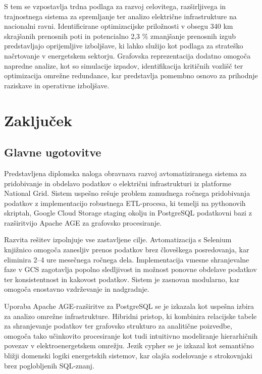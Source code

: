 \documentclass[a4paper,12pt,openright]{book}
\begin{document}
S tem se vzpostavlja trdna podlaga za razvoj celovitega, razširljivega in trajnostnega sistema za spremljanje ter analizo električne infrastrukture na nacionalni ravni. Identificirane optimizacijske priložnosti v obsegu 340 km skrajšanih prenosnih poti in potencialno 2,3 \% zmanjšanje prenosnih izgub predstavljajo oprijemljive izboljšave, ki lahko služijo kot podlaga za strateško načrtovanje v energetskem sektorju. Grafovska reprezentacija dodatno omogoča napredne analize, kot so simulacije izpadov, identifikacija kritičnih vozlišč ter optimizacija omrežne redundance, kar predstavlja pomembno osnovo za prihodnje raziskave in operativne izboljšave.








\chapter{Zaključek}
\section{Glavne ugotovitve}
Predstavljena diplomska naloga obravnava razvoj avtomatiziranega sistema za pridobivanje in obdelavo podatkov o električni infrastrukturi iz platforme National Grid. Sistem uspešno rešuje problem zamudnega ročnega pridobivanja podatkov z implementacijo robustnega ETL-procesa, ki temelji na pythonovih skriptah, Google Cloud Storage staging okolju in PostgreSQL podatkovni bazi z razširitvijo Apache AGE za grafovsko procesiranje.

Razvita rešitev izpolnjuje vse zastavljene cilje. Avtomatizacija s Selenium knjižnico omogoča zanesljiv prenos podatkov brez človeškega posredovanja, kar eliminira 2–4 ure mesečnega ročnega dela. Implementacija vmesne shranjevalne faze v GCS zagotavlja popolno sledljivost in možnost ponovne obdelave podatkov ter konsistentnost in kakovost podatkov. Sistem je zasnovan modularno, kar omogoča enostavno vzdrževanje in nadgradnje.

Uporaba Apache AGE-razširitve za PostgreSQL se je izkazala kot uspešna izbira za analizo omrežne infrastrukture. Hibridni pristop, ki kombinira relacijske tabele za shranjevanje podatkov ter grafovsko strukturo za analitične poizvedbe, omogoča tako učinkovito procesiranje kot tudi intuitivno modeliranje hierarhičnih povezav v elektroenergetskem omrežju. Jezik cypher se je izkazal kot semantično bližji domenski logiki energetskih sistemov, kar olajša sodelovanje s strokovnjaki brez poglobljenih SQL-znanj.
\end{document}

